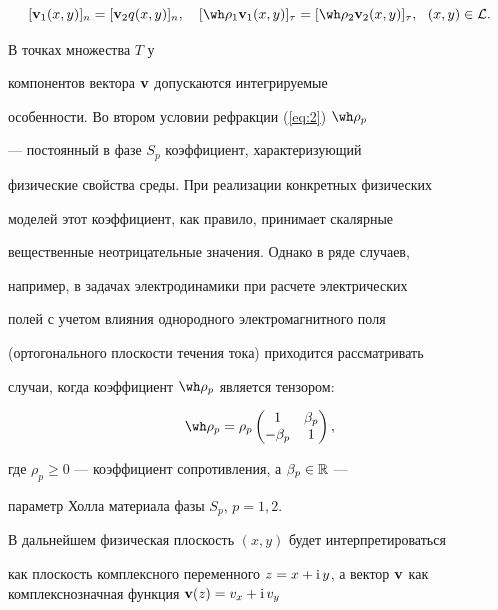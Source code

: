 \begin{equation} 


[{\bold v}_1(x,y)]_n=[{\bold v}_2q(x,y)]_n,\quad [\wh\rho_1{\bold


v}_1(x,y)]_\tau=[\wh\rho_2{\bold v}_2(x,y)]_\tau, \ \ (x,y)\in


{\cal L}. \label{eq:2}


\end{equation}


В точках множества $T$ у


компонентов вектора ${\bold v}$ допускаются интегрируемые


особенности. Во втором условии рефракции (\ref{eq:2}) $\wh\rho_p$


--- постоянный в фазе $S_p$ коэффициент, характеризующий


физические свойства среды. При реализации конкретных физических


моделей этот коэффициент, как правило, принимает скалярные


вещественные неотрицательные значения. Однако в ряде случаев,


например, в задачах электродинамики при расчете электрических


полей с учетом влияния однородного электромагнитного поля


(ортогонального плоскости течения тока) приходится рассматривать


случаи, когда коэффициент $\wh\rho_p $ является тензором:


\begin{equation} %


\wh\rho_p =\rho_p


\begin{pmatrix} 1 & \beta_p\\ -\beta_p & 1\end{pmatrix},\label{eq:3}


\end{equation}


где $\rho_p\geq 0$ --- коэффициент сопротивления, а $\beta_p\in{\Bbb R}$ ---


параметр Холла материала фазы $S_p$, $p=1,2$.





В дальнейшем физическая плоскость $(x,y)$ будет интерпретироваться


как плоскость комплексного переменного $z=x+\i y$, а вектор $\bold


v$ как комплекснозначная функция ${\bold v}(z)=v_x+\i v_y$


